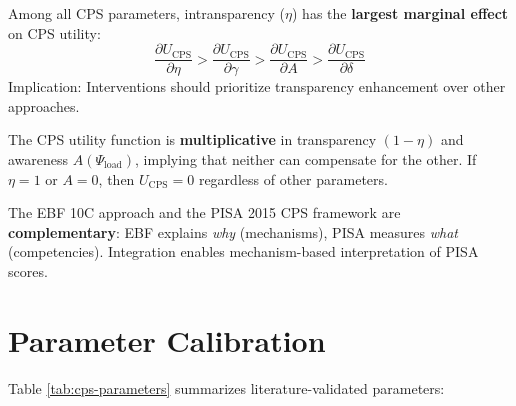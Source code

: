 \begin{tcolorbox}[colback=blue!5!white, colframe=blue!75!black,
    title=Proposition CPS-R2: Intransparency Dominance]
Among all CPS parameters, intransparency ($\eta$) has the \textbf{largest marginal effect} on CPS utility:
\begin{equation}
\frac{\partial U_{\text{CPS}}}{\partial \eta} > \frac{\partial U_{\text{CPS}}}{\partial \gamma} > \frac{\partial U_{\text{CPS}}}{\partial A} > \frac{\partial U_{\text{CPS}}}{\partial \delta}
\end{equation}
Implication: Interventions should prioritize transparency enhancement over other approaches.
\end{tcolorbox}

\begin{tcolorbox}[colback=blue!5!white, colframe=blue!75!black,
    title=Proposition CPS-R3: Multiplicative Structure]
The CPS utility function is \textbf{multiplicative} in transparency $(1-\eta)$ and awareness $A(\Psi_{\text{load}})$, implying that neither can compensate for the other. If $\eta = 1$ or $A = 0$, then $U_{\text{CPS}} = 0$ regardless of other parameters.
\end{tcolorbox}

\begin{tcolorbox}[colback=blue!5!white, colframe=blue!75!black,
    title=Proposition CPS-R4: EBF-PISA Complementarity]
The EBF 10C approach and the PISA 2015 CPS framework are \textbf{complementary}: EBF explains \textit{why} (mechanisms), PISA measures \textit{what} (competencies). Integration enables mechanism-based interpretation of PISA scores.
\end{tcolorbox}



\section{Parameter Calibration}
\label{sec:cps-parameters}

Table \ref{tab:cps-parameters} summarizes literature-validated parameters:

